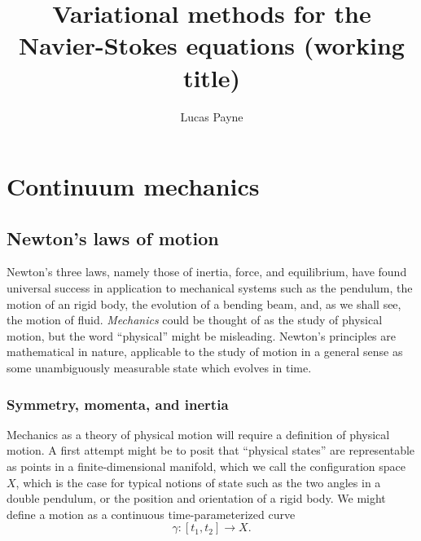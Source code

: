 \documentclass[11pt,a4paper]{memoir}
\title{Variational methods for the Navier-Stokes equations
\scriptsize{(working title)}
}
\author{Lucas Payne}
\begin{document}
\maketitle

\tableofcontents

\chapter{Continuum mechanics}
\section{Newton's laws of motion} %

Newton's three laws, namely those of inertia, force, and equilibrium, have found universal success in application
to mechanical systems such as the pendulum, the motion of an rigid body, the evolution of a bending beam, and, as we shall see,
the motion of fluid. \textit{Mechanics} could be thought of as the study of physical motion, but the word ``physical'' might be misleading.
Newton's principles are mathematical in nature, applicable to the study of motion in a general sense as some unambiguously
measurable state which evolves in time.

\subsection{Symmetry, momenta, and inertia}
Mechanics as a theory of physical motion will require a definition of physical motion. A first attempt might be to posit
that ``physical states'' are representable as points in a finite-dimensional manifold, which we call the configuration space $X$, which is the case for typical
notions of state such as the two angles in a double pendulum, or the position and orientation of a rigid body. We might define a motion as
a continuous time-parameterized curve
    $$\gamma: [t_1, t_2] \rightarrow X.$$
\end{document}
